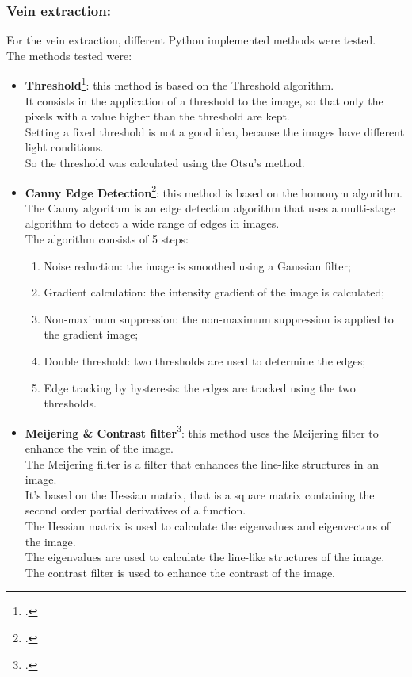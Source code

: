 \subsubsection{Vein extraction:}
For the vein extraction, different Python implemented methods were tested.\\
The methods tested were:
\begin{itemize}
    \item \textbf{Threshold}\footcite{site:opencv-threshold}: this method is based on the Threshold algorithm.\\
    It consists in the application of a threshold to the image, so that only the pixels with a value higher than the threshold are kept.\\
    Setting a fixed threshold is not a good idea, because the images have different light conditions.\\
    So the threshold was calculated using the Otsu's method.\\
    \item \textbf{Canny Edge Detection}\footcite{site:opencv-canny}: this method is based on the homonym algorithm.\\
    The Canny algorithm is an edge detection algorithm that uses a multi-stage algorithm to detect a wide range of edges in images.\\
    The algorithm consists of 5 steps:
    \begin{enumerate}
        \item Noise reduction: the image is smoothed using a Gaussian filter;
        \item Gradient calculation: the intensity gradient of the image is calculated;
        \item Non-maximum suppression: the non-maximum suppression is applied to the gradient image;
        \item Double threshold: two thresholds are used to determine the edges;
        \item Edge tracking by hysteresis: the edges are tracked using the two thresholds.
    \end{enumerate}
    \item \textbf{Meijering \& Contrast filter}\footcite{site:sckit-meijering}: this method uses the Meijering filter to enhance the vein of the image.\\
    The Meijering filter is a filter that enhances the line-like structures in an image.\\
    It's based on the Hessian matrix, that is a square matrix containing the second order partial derivatives of a function.\\
    The Hessian matrix is used to calculate the eigenvalues and eigenvectors of the image.\\
    The eigenvalues are used to calculate the line-like structures of the image.\\
    The contrast filter is used to enhance the contrast of the image.\\
\end{itemize}
